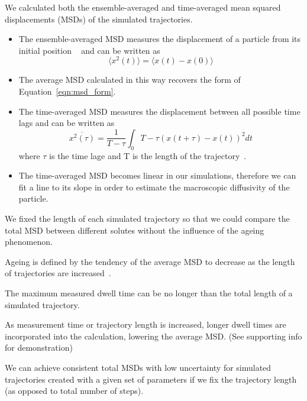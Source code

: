 \documentclass{article}
\begin{document}
  We calculated both the ensemble-averaged and time-averaged mean squared displacements (MSDs)
  of the simulated trajectories.
  \begin{itemize}
	\item The ensemble-averaged MSD measures the displacement of a particle from its initial
	position ~\cite{meroz_toolbox_2015} and can be written as
	\begin{equation}
	\langle x^2(t) \rangle = \langle x(t) - x(0) \rangle
	\label{eqn:ensemble_msd}
	\end{equation}
	\item The average MSD calculated in this way recovers the form of
	Equation~\ref{eqn:msd_form}. 
	\item The time-averaged MSD measures the displacement between all possible time lags
	and can be written as
	\begin{equation}
	\overline{x^2(\tau)} = \dfrac{1}{T - \tau}\int_{0}{T - \tau} (x(t + \tau) - x(t))^2 dt
	\end{equation}
	where $\tau$ is the time lage and T is the length of the
	trajectory~\cite{meroz_toolbox_2015}. 
	\item The time-averaged MSD becomes linear in our simulations,
	therefore we can fit a line to its slope in order to estimate the macroscopic
	diffusivity of the particle.
  \end{itemize}

  We fixed the length of each simulated trajectory so that we could compare the total
  MSD between different solutes without the influence of the ageing phenomenon.
  \begin{item}
	\item Ageing is defined by the tendency of the average MSD to decrease
	as the length of trajectories are increased~\cite{metzler_anomalous_2014}.
	\item The maximum measured dwell time can be no longer than the total length
	of a simulated trajectory. 
	\item As measurement time or trajectory length is increased, longer dwell times
	are incorporated into the calculation, lowering the average MSD. (See supporting
	info for demonstration)
	\item We can achieve consistent total MSDs with low uncertainty for
	simulated trajectories created with a given set of parameters if we fix the
	trajectory length (as opposed to total number of steps).  
  \end{item}
\end{document}
